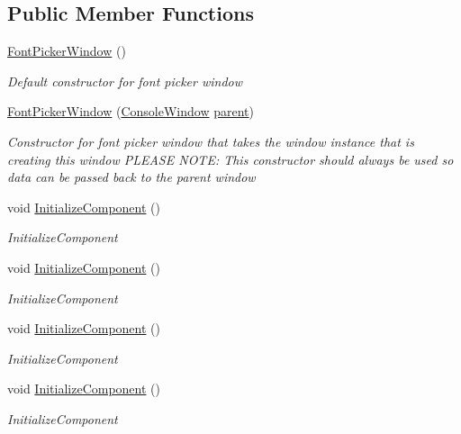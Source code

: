 \subsection*{Public Member Functions}
\begin{DoxyCompactItemize}
\item 
\hyperlink{class_c_p_u___o_s___simulator_1_1_font_picker_window_ac395cdfa521446c47bfded624bbfdba6}{Font\+Picker\+Window} ()
\begin{DoxyCompactList}\small\item\em Default constructor for font picker window \end{DoxyCompactList}\item 
\hyperlink{class_c_p_u___o_s___simulator_1_1_font_picker_window_a8ff9dfbc882890c0b7b76468d51dd386}{Font\+Picker\+Window} (\hyperlink{class_c_p_u___o_s___simulator_1_1_console_window}{Console\+Window} \hyperlink{class_c_p_u___o_s___simulator_1_1_font_picker_window_a4e59cc593e060f3229adc8decfeb151c}{parent})
\begin{DoxyCompactList}\small\item\em Constructor for font picker window that takes the window instance that is creating this window P\+L\+E\+A\+S\+E N\+O\+T\+E\+: This constructor should always be used so data can be passed back to the parent window \end{DoxyCompactList}\item 
void \hyperlink{class_c_p_u___o_s___simulator_1_1_font_picker_window_aca751fede84bf642f74ddf1030cbf034}{Initialize\+Component} ()
\begin{DoxyCompactList}\small\item\em Initialize\+Component \end{DoxyCompactList}\item 
void \hyperlink{class_c_p_u___o_s___simulator_1_1_font_picker_window_aca751fede84bf642f74ddf1030cbf034}{Initialize\+Component} ()
\begin{DoxyCompactList}\small\item\em Initialize\+Component \end{DoxyCompactList}\item 
void \hyperlink{class_c_p_u___o_s___simulator_1_1_font_picker_window_aca751fede84bf642f74ddf1030cbf034}{Initialize\+Component} ()
\begin{DoxyCompactList}\small\item\em Initialize\+Component \end{DoxyCompactList}\item 
void \hyperlink{class_c_p_u___o_s___simulator_1_1_font_picker_window_aca751fede84bf642f74ddf1030cbf034}{Initialize\+Component} ()
\begin{DoxyCompactList}\small\item\em Initialize\+Component \end{DoxyCompactList}\end{DoxyCompactItemize}
